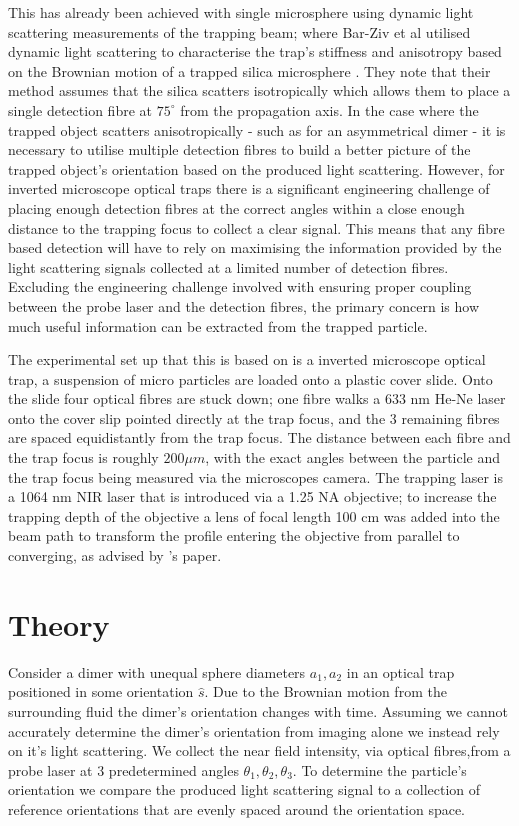 \documentclass[11pt]{article}
\begin{document}
	This has already been achieved with single microsphere using dynamic light scattering measurements of the trapping beam; where Bar-Ziv et al utilised dynamic light scattering to characterise the trap's stiffness and anisotropy based on the Brownian motion of a trapped silica microsphere \cite{Dynamic_trap_scattering}. They note that their method assumes that the silica scatters isotropically which allows them to place a single detection fibre at $75^\circ$ from the propagation axis. In the case where the trapped object scatters anisotropically - such as for an asymmetrical dimer - it is necessary to utilise multiple detection fibres to build a better picture of the trapped object's orientation based on the produced light scattering. However, for inverted microscope optical traps there is a significant engineering challenge of placing enough detection fibres at the correct angles within a close enough distance to the trapping focus to collect a clear signal. This means that any fibre based detection will have to rely on maximising the information provided by the light scattering signals collected at a limited number of detection fibres. Excluding the engineering challenge involved with ensuring proper coupling between the probe laser and the detection fibres, the primary concern is how much useful information can be extracted from the trapped particle. 
	
	The experimental set up that this is based on is a inverted microscope optical trap, a suspension of micro particles are loaded onto a plastic cover slide. Onto the slide four optical fibres are stuck down; one fibre walks a 633 nm He-Ne laser onto the cover slip pointed directly at the trap focus, and the 3 remaining fibres are spaced equidistantly from the trap focus. The distance between each fibre and the trap focus is roughly $200\mu m$, with the exact angles between the particle and the trap focus being measured via the microscopes camera. The trapping laser is a 1064 nm NIR laser that is introduced via a 1.25 NA objective; to increase the trapping depth of the objective a lens of focal length 100 cm was added into the beam path to transform the profile entering the objective from parallel to converging, as advised by \cite{Long_distance_trap}'s paper. 
	
	\section*{Theory}
	
	Consider a dimer with unequal sphere diameters $a_1, a_2$ in an optical trap positioned in some orientation $\hat{s}$. Due to the Brownian motion from the surrounding fluid the dimer's orientation changes with time. Assuming we cannot accurately determine the dimer's orientation from imaging alone we instead rely on it's light scattering. We collect the near field intensity, via optical fibres,from a probe laser at 3 predetermined angles $\theta_1, \theta_2, \theta_3$. To determine the particle's orientation we compare the produced light scattering signal to a collection of reference orientations that are evenly spaced around the orientation space.
	   
\end{document}
